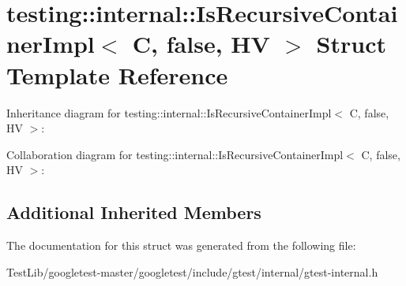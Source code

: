 \hypertarget{structtesting_1_1internal_1_1IsRecursiveContainerImpl_3_01C_00_01false_00_01HV_01_4}{}\section{testing\+:\+:internal\+:\+:Is\+Recursive\+Container\+Impl$<$ C, false, HV $>$ Struct Template Reference}
\label{structtesting_1_1internal_1_1IsRecursiveContainerImpl_3_01C_00_01false_00_01HV_01_4}


Inheritance diagram for testing\+:\+:internal\+:\+:Is\+Recursive\+Container\+Impl$<$ C, false, HV $>$\+:


Collaboration diagram for testing\+:\+:internal\+:\+:Is\+Recursive\+Container\+Impl$<$ C, false, HV $>$\+:
\subsection*{Additional Inherited Members}


The documentation for this struct was generated from the following file\+:\begin{DoxyCompactItemize}
\item 
Test\+Lib/googletest-\/master/googletest/include/gtest/internal/gtest-\/internal.\+h\end{DoxyCompactItemize}
